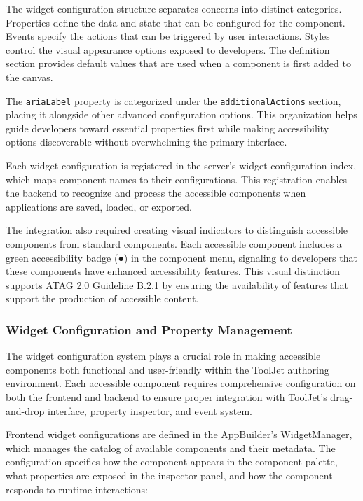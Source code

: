The widget configuration structure separates concerns into distinct categories. Properties define the data and state that can be configured for the component. Events specify the actions that can be triggered by user interactions. Styles control the visual appearance options exposed to developers. The definition section provides default values that are used when a component is first added to the canvas.

The \texttt{ariaLabel} property is categorized under the \texttt{additionalActions} section, placing it alongside other advanced configuration options. This organization helps guide developers toward essential properties first while making accessibility options discoverable without overwhelming the primary interface.

Each widget configuration is registered in the server's widget configuration index, which maps component names to their configurations. This registration enables the backend to recognize and process the accessible components when applications are saved, loaded, or exported.

The integration also required creating visual indicators to distinguish accessible components from standard components. Each accessible component includes a green accessibility badge (●) in the component menu, signaling to developers that these components have enhanced accessibility features. This visual distinction supports ATAG 2.0 Guideline B.2.1 by ensuring the availability of features that support the production of accessible content.

\subsubsection{Widget Configuration and Property Management}

The widget configuration system plays a crucial role in making accessible components both functional and user-friendly within the ToolJet authoring environment. Each accessible component requires comprehensive configuration on both the frontend and backend to ensure proper integration with ToolJet's drag-and-drop interface, property inspector, and event system.

Frontend widget configurations are defined in the AppBuilder's WidgetManager, which manages the catalog of available components and their metadata. The configuration specifies how the component appears in the component palette, what properties are exposed in the inspector panel, and how the component responds to runtime interactions:

